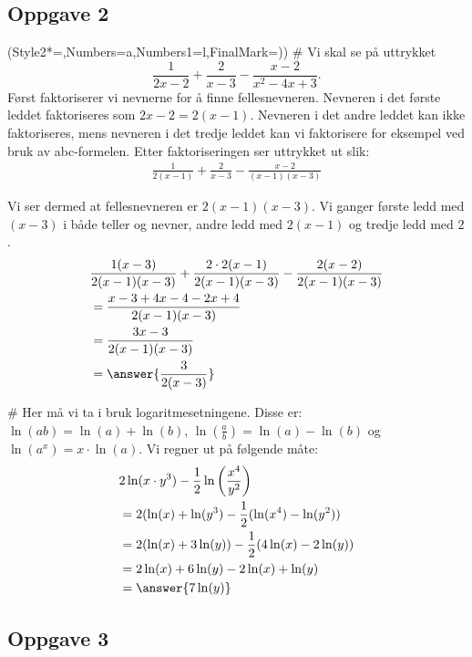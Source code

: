 \subsection*{Oppgave 2}
\begin{easylist}[enumerate]
	\ListProperties(Style2*=,Numbers=a,Numbers1=l,FinalMark={)})
	# Vi skal se på uttrykket
	\begin{equation*}
		\frac{1}{2x-2} + \frac{2}{x-3} - \frac{x-2}{x^2 - 4x +3}.
	\end{equation*}
	Først faktoriserer vi nevnerne for å finne fellesnevneren. 
	Nevneren i det første leddet faktoriseres som $2x-2 = 2(x-1)$. 
	Nevneren i det andre leddet kan ikke faktoriseres, mens nevneren i det tredje leddet kan vi faktorisere for eksempel ved bruk av abc-formelen.
	 Etter faktoriseringen ser uttrykket ut slik:
	\begin{align*}
			\frac{1}{2(x-1)} + \frac{2}{x-3} - \frac{x-2}{(x-1)(x-3)}
	\end{align*}
	
	Vi ser dermed at fellesnevneren er $2(x-1)(x-3)$. Vi ganger første ledd med $(x-3)$ i både teller og nevner, andre ledd med $2(x-1)$ og tredje ledd med $2$.
	\begin{align*}
		&\frac{1(x-3)}{2(x-1)(x-3)} + \frac{2 \cdot 2(x-1)}{2(x-1)(x-3)} - \frac{2(x-2)}{2(x-1)(x-3)} \\
		& = \frac{x - 3 +4x - 4 - 2x + 4}{2(x-1)(x-3)} \\
		& = \frac{3x-3}{2(x-1)(x-3)}\\
		& = \answer{\frac{3}{2(x-3)}}
	\end{align*}
	
	# Her må vi ta i bruk logaritmesetningene. Disse er: 
	$\ln(ab) = \ln(a) + \ln(b)$, 
	$\ln\left(\frac{a}{b}\right) = \ln(a) - \ln(b)$ og 
	$\ln(a^x) = x \cdot \ln(a)$.
	Vi regner ut på følgende måte:
	\begin{align*}
		&2\ln(x\cdot y^3) - \frac{1}{2} \ln \left (\frac{x^4}{y^2} \right) \\
		& = 2(\ln(x) + \ln(y^3) - \frac{1}{2}(\ln(x^4) - \ln(y^2)) \\
		& = 2(\ln(x) + 3\ln(y)) - \frac{1}{2}(4\ln(x) - 2\ln(y))\\
		& = 2\ln(x) + 6\ln(y) - 2\ln(x) + \ln(y)\\
		& = \answer{7\ln(y)}
	\end{align*}
	
\end{easylist}

\subsection*{Oppgave 3}

